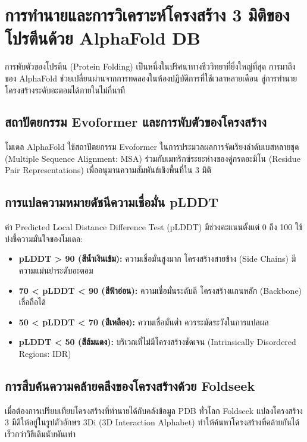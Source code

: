 \chapter{การทำนายและการวิเคราะห์โครงสร้าง 3 มิติของโปรตีนด้วย AlphaFold DB}

การพับตัวของโปรตีน (Protein Folding) เป็นหนึ่งในปริศนาทางชีววิทยาที่ยิ่งใหญ่ที่สุด การมาถึงของ AlphaFold ช่วยเปลี่ยนผ่านจากการทดลองในห้องปฏิบัติการที่ใช้เวลาหลายเดือน สู่การทำนายโครงสร้างระดับอะตอมได้ภายในไม่กี่นาที

\section{สถาปัตยกรรม Evoformer และการพับตัวของโครงสร้าง}

โมเดล AlphaFold ใช้สถาปัตยกรรม Evoformer ในการประมวลผลการจัดเรียงลำดับเบสหลายชุด (Multiple Sequence Alignment: MSA) ร่วมกับเมทริกซ์ระยะห่างของคู่กรดอะมิโน (Residue Pair Representations) เพื่ออนุมานความสัมพันธ์เชิงพื้นที่ใน 3 มิติ

\section{การแปลความหมายดัชนีความเชื่อมั่น pLDDT}

ค่า Predicted Local Distance Difference Test (pLDDT) มีช่วงคะแนนตั้งแต่ 0 ถึง 100 ใช้บ่งชี้ความมั่นใจของโมเดล:
\begin{itemize}
    \item \textbf{pLDDT > 90 (สีน้ำเงินเข้ม):} ความเชื่อมั่นสูงมาก โครงสร้างสายข้าง (Side Chains) มีความแม่นยำระดับอะตอม
    \item \textbf{70 < pLDDT < 90 (สีฟ้าอ่อน):} ความเชื่อมั่นระดับดี โครงสร้างแกนหลัก (Backbone) เชื่อถือได้
    \item \textbf{50 < pLDDT < 70 (สีเหลือง):} ความเชื่อมั่นต่ำ ควรระมัดระวังในการแปลผล
    \item \textbf{pLDDT < 50 (สีส้มแดง):} บริเวณที่ไม่มีโครงสร้างชัดเจน (Intrinsically Disordered Regions: IDR)
\end{itemize}

\section{การสืบค้นความคล้ายคลึงของโครงสร้างด้วย Foldseek}

เมื่อต้องการเปรียบเทียบโครงสร้างที่ทำนายได้กับคลังข้อมูล PDB ทั่วโลก Foldseek แปลงโครงสร้าง 3 มิติให้อยู่ในรูปตัวอักษร 3Di (3D Interaction Alphabet) ทำให้ค้นหาโครงสร้างที่คล้ายกันได้เร็วกว่าวิธีเดิมนับพันเท่า
